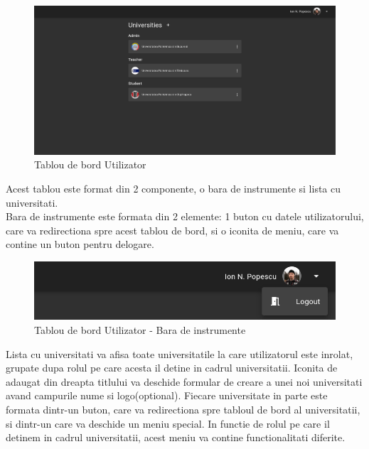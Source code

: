 \documentclass[12pt, a4paper, oneside, romanian]{teza-upb}
\begin{document}
\begin{figure}[H]
\centering
\includegraphics*[width=\columnwidth]{tablou-de-bord-utilizator}
\caption{Tablou de bord Utilizator}
\label{tablou-de-bord-utilizator}
\end{figure}

Acest tablou este format din 2 componente, o bara de instrumente si lista cu universitati.\\

Bara de instrumente este formata din 2 elemente: 1 buton cu datele utilizatorului, care va redirectiona spre acest tablou de bord, si o iconita de meniu, care va contine un buton pentru delogare.

\begin{figure}[H]
\centering
\includegraphics*[width=\columnwidth]{tablou-de-bord-utilizator-bara-de-instrumente}
\caption{Tablou de bord Utilizator - Bara de instrumente}
\label{tablou-de-bord-utilizator-bara-de-instrumente}
\end{figure}

Lista cu universitati va afisa toate universitatile la care utilizatorul este inrolat, grupate dupa rolul pe care acesta il detine in cadrul universitatii. Iconita de adaugat din dreapta titlului va deschide formular de creare a unei noi universitati avand campurile nume si logo(optional). Fiecare universitate in parte este formata dintr-un buton, care va redirectiona spre tabloul de bord al universitatii, si dintr-un care va deschide un meniu special. In functie de rolul pe care il detinem in cadrul universitatii, acest meniu va contine functionalitati diferite.
\end{document}
